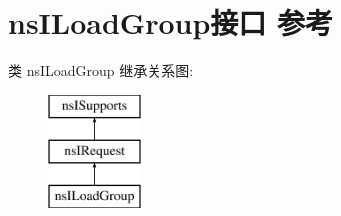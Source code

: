 \hypertarget{interfacens_i_load_group}{}\section{ns\+I\+Load\+Group接口 参考}
\label{interfacens_i_load_group}
类 ns\+I\+Load\+Group 继承关系图\+:\begin{figure}[H]
\begin{center}
\leavevmode
\includegraphics[height=3.000000cm]{interfacens_i_load_group}
\end{center}
\end{figure}
